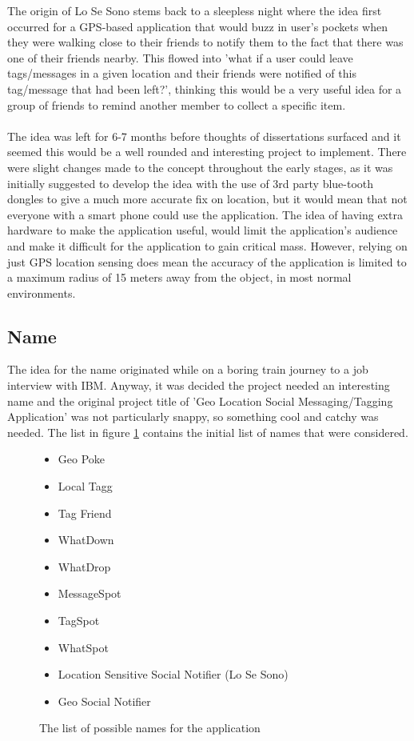 The origin of Lo Se Sono stems back to a sleepless night where the idea first occurred for a GPS-based application that would buzz in user's pockets when they were walking close to their friends to notify them to the fact that there was one of their friends nearby. This flowed into 'what if a user could leave tags/messages in a given location and their friends were notified of this tag/message that had been left?', thinking this would be a very useful idea for a group of friends to remind another member to collect a specific item.\\
\\
The idea was left for 6-7 months before thoughts of dissertations surfaced and it seemed this would be a well rounded and interesting project to implement. There were slight changes made to the concept throughout the early stages, as it was initially suggested to develop the idea with the use of 3rd party blue-tooth dongles to give a much more accurate fix on location, but it would mean that not everyone with a smart phone could use the application. The idea of having extra hardware to make the application useful, would limit the application's audience and make it difficult for the application to gain critical mass. However, relying on just GPS location sensing does mean the accuracy of the application is limited to a maximum radius of 15 meters away from the object, in most normal environments.

\subsection{Name}

The idea for the name originated while on a boring train journey to a job interview with IBM. Anyway, it was decided the project needed an interesting name and the original project title of 'Geo Location Social Messaging/Tagging Application' was not particularly snappy, so something cool and catchy was needed. The list in figure \ref{fig:list_of_names} contains the initial list of names that were considered. 

\begin{figure}[H]
\begin{itemize}
\item Geo Poke
\item Local Tagg
\item Tag Friend
\item WhatDown
\item WhatDrop
\item MessageSpot
\item TagSpot
\item WhatSpot
\item Location Sensitive Social Notifier (Lo Se Sono)
\item Geo Social Notifier
\end{itemize}
\caption{The list of possible names for the application}
\label{fig:list_of_names}
\end{figure}

